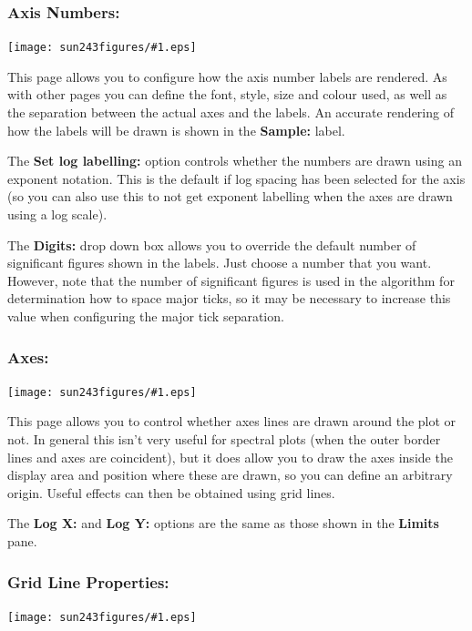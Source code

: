 \documentclass[twoside,11pt]{article}
\newcommand{\htmladdimg}[1]{}
\newcommand{\latexhtml}[2]{#1}
\renewcommand{\_}{\texttt{\symbol{95}}}
\newcommand{\mainfigure}[1]
{\begin{center}
 \latexhtml{\texttt{[image: sun243\_figures/\#1.eps]}}{\htmladdimg{#1.gif}}
 \end{center}
}
\newcommand{\labelitem}[1]{\textbf{#1}}
\begin{document}
\newpage
\subsubsection*{Axis Numbers:}

\mainfigure{configurewindowaxisnumbers}

This page allows you to configure how the axis number labels are rendered. As
with other pages you can define the font, style, size and colour used, as well
as the separation between the actual axes and the labels. An accurate
rendering of how the labels will be drawn is shown in the \labelitem{Sample:}
label.

The \labelitem{Set log labelling:} option controls whether the numbers are
drawn using an exponent notation. This is the default if log spacing has been
selected for the axis (so you can also use this to not get exponent labelling
when the axes are drawn using a log scale).

The \labelitem{Digits:} drop down box allows you to override the
default number of significant figures shown in the labels. Just choose
a number that you want. However, note that the number of significant
figures is used in the algorithm for determination how to space major
ticks, so it may be necessary to increase this value when configuring
the major tick separation.

\newpage
\subsubsection*{Axes:}

\mainfigure{configurewindowaxes}

This page allows you to control whether axes lines are drawn around the plot
or not. In general this isn't very useful for spectral plots (when the outer
border lines and axes are coincident), but it does allow you to draw the axes
inside the display area and position where these are drawn, so you can define
an arbitrary origin. Useful effects can then be obtained using grid lines.

The \labelitem{Log X:} and \labelitem{Log Y:} options are the same as those
shown in the \labelitem{Limits} pane.

\newpage
\subsubsection*{Grid Line Properties:}

\mainfigure{configurewindowgrid}
\end{document}
